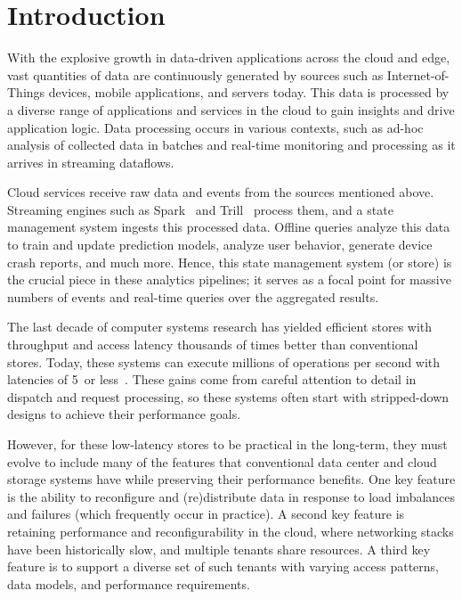 \chapter{Introduction}

With the explosive growth in data-driven applications across the cloud
and edge, vast quantities of data are continuously generated by sources
such as Internet-of-Things devices, mobile applications, and servers
today.
%
This data is processed by a diverse range of applications and
services in the cloud to gain insights and drive application logic.
%
Data
processing occurs in various contexts, such as ad-hoc analysis of
collected data in batches and real-time monitoring and processing as it
arrives in streaming dataflows.

Cloud services receive raw data and events from the sources mentioned
above.
%
Streaming engines such as Spark~\cite{spark} and Trill~\cite{trill} process
them, and a state management system ingests this processed data.
%
Offline
queries analyze this data to train and update prediction models, analyze
user behavior, generate device crash reports, and much more.
%
Hence, this
state management system (or store) is the crucial piece in these
analytics pipelines; it serves as a focal point for massive numbers of
events and real-time queries over the aggregated results.

The last decade of computer systems research has yielded efficient
stores with throughput and access latency thousands
of times better than conventional stores.
%
Today,
these systems can execute millions of operations per second
with latencies
of 5~\us or less~\cite{mica,ramcloud,farm-2014}.
%
%
These gains come from careful attention to detail in dispatch and
request processing,
so these systems often start with stripped-down designs to
achieve their performance goals.

However, for these low-latency stores to be practical in the long-term,
they must evolve to include many of the features that conventional data
center and cloud storage systems have while preserving their performance
benefits.
%
One key feature is the ability to reconfigure and
(re)distribute data in response to load imbalances and failures (which
frequently occur in practice).
%
A second key feature is retaining
performance and reconfigurability in the cloud, where networking stacks
have been historically slow, and multiple tenants share resources.
%
A third key feature is to support a diverse set of such tenants with
varying access patterns, data models, and performance requirements.

